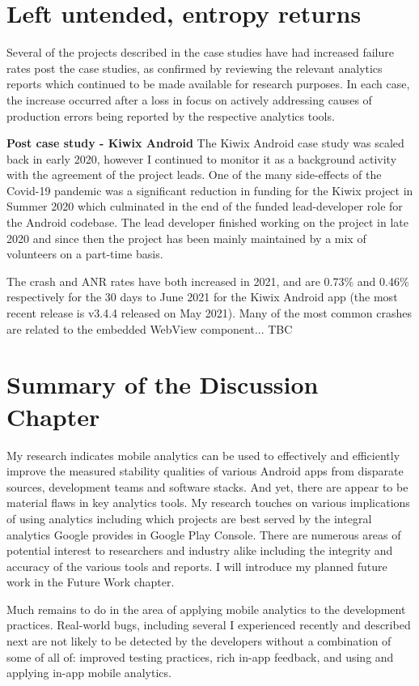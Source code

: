 \section{Left untended, entropy returns}
Several of the projects described in the case studies have had increased failure rates post the case studies, as confirmed by reviewing the relevant analytics reports which continued to be made available for research purposes. In each case, the increase occurred after a loss in focus on actively addressing causes of production errors being reported by the respective analytics tools.

\textbf{Post case study - Kiwix Android}
The Kiwix Android case study was scaled back in early 2020, however I continued to monitor it as a background activity with the agreement of the project leads. One of the many side-effects of the Covid-19 pandemic was a significant reduction in funding for the Kiwix project in Summer 2020 which culminated in the end of the funded lead-developer role for the Android codebase. The lead developer finished working on the project in late 2020 and since then the project has been mainly maintained by a mix of volunteers on a part-time basis. 

The crash and ANR rates have both increased in 2021, and are 0.73\% and 0.46\% respectively for the 30 days to  June 2021 for the Kiwix Android app (the most recent release is v3.4.4 released on  May 2021). Many of the most common crashes are related to the embedded WebView component... TBC



\section{Summary of the Discussion Chapter}
My research indicates mobile analytics can be used to effectively and efficiently improve the measured stability qualities of various Android apps from disparate sources, development teams and software stacks. And yet, there are appear to be material flaws in key analytics tools. My research touches on various implications of using analytics including which projects are best served by the integral analytics Google provides in Google Play Console. There are numerous areas of potential interest to researchers and industry alike including the integrity and accuracy of the various tools and reports. I will introduce my planned future work in the Future Work chapter.


Much remains to do in the area of applying mobile analytics to the development practices. Real-world bugs, including several I experienced recently and described next are not likely to be detected by the developers without a combination of some of all of: improved testing practices, rich in-app feedback, and using and applying in-app mobile analytics.

